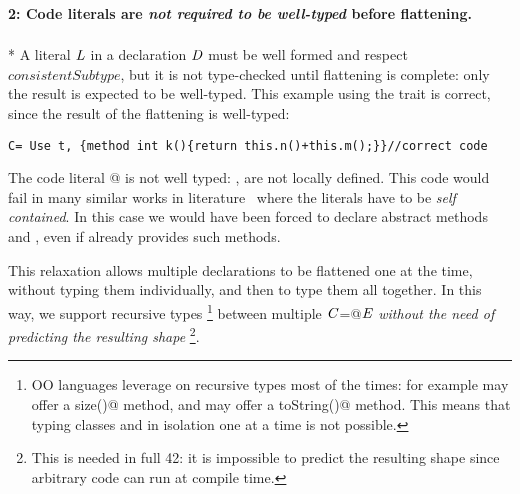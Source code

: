 \paragraph{2: Code literals are \emph{not required to be well-typed} before flattening.}${}_{}$\\*
A literal $\mathit{L}$ in a declaration $\mathit{D}$
must be well formed and respect
$\mathit{consistentSubtype}$, but
it is not type-checked until flattening is complete:
only the result is expected to be well-typed.
This example using the trait \Q@t@ is correct, since
the result of the flattening is well-typed:

\saveSpace\saveSpace\begin{lstlisting}
C= Use t, {method int k(){return this.n()+this.m();}}//correct code
\end{lstlisting}\saveSpace\saveSpace

\noindent The code literal
@
is not well typed: \Q@n@, \Q@m@ are not locally defined.
This code would fail in many similar works in literature~\cite{deep,Bettini2015282,Bergel2007} where the
literals have to be \emph{self contained}. In this case we would have been forced to
declare abstract methods \Q@n@ and \Q@m@, even if \Q@t@ already 
provides such methods.

This relaxation allows multiple declarations to be flattened one at the time, without typing them individually, and then to type them all together.
In this way, we support recursive types%
\footnote{
OO languages leverage on recursive types most of the times:
for example \Q@String@ may offer a \Q@Int size()@
method, and \Q@Int@ may offer a \Q@String toString()@ method.
This means that typing classes 
\Q@String@ and \Q@Int@ in isolation one at a time is not possible.}
between multiple $\mathit{C}$\Q@=@$\mathit{E}$ \emph{without
the need of predicting the resulting shape}%
\footnote{This is needed in full 42: it is
impossible to predict the resulting shape since
arbitrary code can run at compile time.}.

